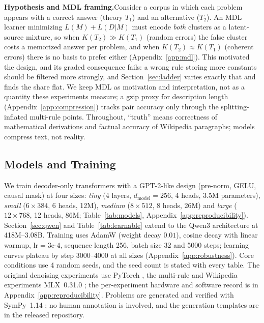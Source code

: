\documentclass{article}
\begin{document}
\textbf{Hypothesis and MDL framing.}\quad Consider a corpus in which each problem appears with a correct answer (theory $T_1$) and an alternative ($T_2$). An MDL learner \citep{rissanen1978modeling,grunwald2007minimum} minimizing $L(M) + L(D|M)$ must encode \emph{both} clusters as a latent-source mixture, so when $K(T_2) \gg K(T_1)$ (random errors) the false cluster costs a memorized answer per problem, and when $K(T_2) \approx K(T_1)$ (coherent errors) there is no basis to prefer either (Appendix~\ref{app:mdl}). This motivated the design, and its graded consequence fails: a wrong rule storing more constants should be filtered more strongly, and Section~\ref{sec:ladder} varies exactly that and finds the share flat. We keep MDL as motivation and interpretation, not as a quantity these experiments measure; a gzip proxy for description length (Appendix~\ref{app:compression}) tracks pair accuracy only through the splitting-inflated multi-rule points. Throughout, ``truth'' means correctness of mathematical derivations and factual accuracy of Wikipedia paragraphs; models compress text, not reality.

\subsection{Models and Training}
\label{sec:models}

We train decoder-only transformers with a GPT-2-like design \citep{radford2019language} (pre-norm, GELU, causal mask) at four sizes: \emph{tiny} (4 layers, $d_{\text{model}}{=}256$, 4 heads, 3.5M parameters), \emph{small} ($6 \times 384$, 6 heads, 12M), \emph{medium} ($8 \times 512$, 8 heads, 26M) and \emph{large} ($12 \times 768$, 12 heads, 86M; Table~\ref{tab:models}, Appendix~\ref{app:reproducibility}). Section~\ref{sec:qwen} and Table~\ref{tab:learnable} extend to the Qwen3 architecture \citep{yang2025qwen3} at 418M--3.08B. Training uses AdamW (weight decay $0.01$), cosine decay with linear warmup, $\text{lr}=3\text{e-}4$, sequence length 256, batch size 32 and 5000 steps; learning curves plateau by step 3000--4000 at all sizes (Appendix~\ref{app:robustness}). Core conditions use 4 random seeds, and the seed count is stated with every table. The original denoising experiments use PyTorch \citep{paszke2019pytorch}, the multi-rule and Wikipedia experiments MLX~0.31.0 \citep{mlx2023}; the per-experiment hardware and software record is in Appendix~\ref{app:reproducibility}. Problems are generated and verified with SymPy~1.14 \citep{meurer2017sympy}; no human annotation is involved, and the generation templates are in the released repository.
\end{document}

